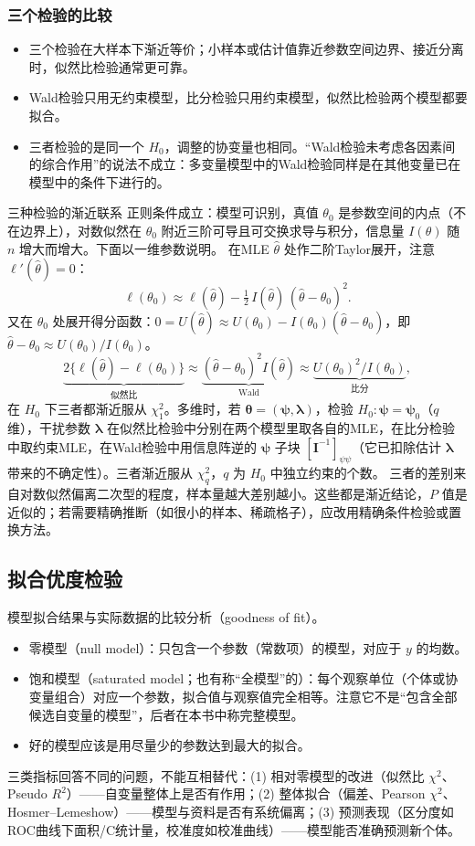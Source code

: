\subsubsection{三个检验的比较}
\begin{itemize}
\item 三个检验在大样本下渐近等价；小样本或估计值靠近参数空间边界、接近分离时，似然比检验通常更可靠。
\item Wald检验只用无约束模型，比分检验只用约束模型，似然比检验两个模型都要拟合。
\item 三者检验的是同一个 $H_0$，调整的协变量也相同。“Wald检验未考虑各因素间的综合作用”的说法不成立：多变量模型中的Wald检验同样是在其他变量已在模型中的条件下进行的。
\end{itemize}
\begin{derivation}{三种检验的渐近联系}
正则条件成立：模型可识别，真值 $\theta_0$ 是参数空间的内点（不在边界上），对数似然在 $\theta_0$ 附近三阶可导且可交换求导与积分，信息量 $I(\theta)$ 随 $n$ 增大而增大。下面以一维参数说明。
在MLE $\widehat\theta$ 处作二阶Taylor展开，注意 $\ell'(\widehat\theta)=0$：
\[
\ell(\theta_0)\approx\ell(\widehat\theta)-\tfrac12\,I(\widehat\theta)\,(\widehat\theta-\theta_0)^2 .
\]
又在 $\theta_0$ 处展开得分函数：$0=U(\widehat\theta)\approx U(\theta_0)-I(\theta_0)(\widehat\theta-\theta_0)$，即 $\widehat\theta-\theta_0\approx U(\theta_0)/I(\theta_0)$。
\[
\underbrace{2\{\ell(\widehat\theta)-\ell(\theta_0)\}}_{\text{似然比}}\approx
\underbrace{(\widehat\theta-\theta_0)^2I(\widehat\theta)}_{\text{Wald}}\approx
\underbrace{U(\theta_0)^2/I(\theta_0)}_{\text{比分}},
\]
在 $H_0$ 下三者都渐近服从 $\chi^2_1$。多维时，若 $\bm\theta=(\bm\psi,\bm\lambda)$，检验 $H_0:\bm\psi=\bm\psi_0$（$q$ 维），干扰参数 $\bm\lambda$ 在似然比检验中分别在两个模型里取各自的MLE，在比分检验中取约束MLE，在Wald检验中用信息阵逆的 $\bm\psi$ 子块 $[\bm I^{-1}]_{\psi\psi}$（它已扣除估计 $\bm\lambda$ 带来的不确定性）。三者渐近服从 $\chi^2_q$，$q$ 为 $H_0$ 中独立约束的个数。
三者的差别来自对数似然偏离二次型的程度，样本量越大差别越小。这些都是渐近结论，$P$ 值是近似的；若需要精确推断（如很小的样本、稀疏格子），应改用精确条件检验或置换方法。
\end{derivation}
\subsection{拟合优度检验}
模型拟合结果与实际数据的比较分析（goodness of fit）。
\begin{itemize}
\item 零模型（null model）：只包含一个参数（常数项）的模型，对应于 $y$ 的均数。
\item 饱和模型（saturated model；也有称“全模型”的）：每个观察单位（个体或协变量组合）对应一个参数，拟合值与观察值完全相等。注意它不是“包含全部候选自变量的模型”，后者在本书中称完整模型。
\item 好的模型应该是用尽量少的参数达到最大的拟合。
\end{itemize}
三类指标回答不同的问题，不能互相替代：(1) 相对零模型的改进（似然比 $\chi^2$、Pseudo $R^2$）——自变量整体上是否有作用；(2) 整体拟合（偏差、Pearson $\chi^2$、Hosmer--Lemeshow）——模型与资料是否有系统偏离；(3) 预测表现（区分度如ROC曲线下面积/C统计量，校准度如校准曲线）——模型能否准确预测新个体。
